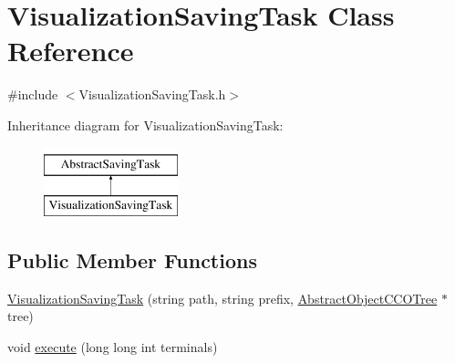 \hypertarget{class_visualization_saving_task}{}\section{Visualization\+Saving\+Task Class Reference}
\label{class_visualization_saving_task}


{\ttfamily \#include $<$Visualization\+Saving\+Task.\+h$>$}

Inheritance diagram for Visualization\+Saving\+Task\+:\begin{figure}[H]
\begin{center}
\leavevmode
\includegraphics[height=2.000000cm]{df/d93/class_visualization_saving_task}
\end{center}
\end{figure}
\subsection*{Public Member Functions}
\begin{DoxyCompactItemize}
\item 
\hyperlink{class_visualization_saving_task_ab1b9318d4f8629a2d0f37355af3b9666}{Visualization\+Saving\+Task} (string path, string prefix, \hyperlink{class_abstract_object_c_c_o_tree}{Abstract\+Object\+C\+C\+O\+Tree} $\ast$tree)
\item 
void \hyperlink{class_visualization_saving_task_ac778c955205908fe4d5299b024fa2e6b}{execute} (long long int terminals)
\end{DoxyCompactItemize}
